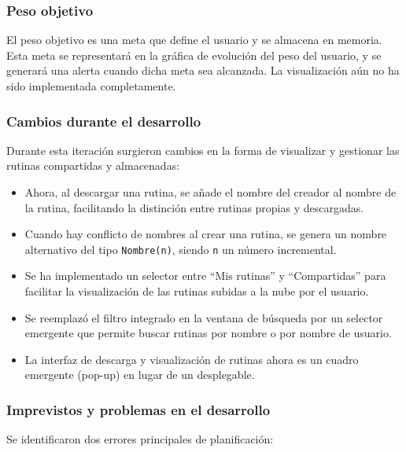 \subsubsection{Peso objetivo} %
El peso objetivo es una meta que define el usuario y se almacena en memoria. Esta meta se representar\'a en la gr\'afica de evoluci\'on del peso del usuario, y se generar\'a una alerta cuando dicha meta sea alcanzada. La visualizaci\'on a\'un no ha sido implementada completamente. %

\subsubsection{Cambios durante el desarrollo} 

Durante esta iteraci\'on surgieron cambios en la forma de visualizar y gestionar las rutinas compartidas y almacenadas:

\begin{itemize}
  \item Ahora, al descargar una rutina, se a\~nade el nombre del creador al nombre de la rutina, facilitando la distinci\'on entre rutinas propias y descargadas.
  \item Cuando hay conflicto de nombres al crear una rutina, se genera un nombre alternativo del tipo \texttt{Nombre(n)}, siendo \texttt{n} un n\'umero incremental.
  \item Se ha implementado un selector entre ``Mis rutinas'' y ``Compartidas'' para facilitar la visualizaci\'on de las rutinas subidas a la nube por el usuario.
  \item Se reemplaz\'o el filtro integrado en la ventana de b\'usqueda por un selector emergente que permite buscar rutinas por nombre o por nombre de usuario.
  \item La interfaz de descarga y visualizaci\'on de rutinas ahora es un cuadro emergente (pop-up) en lugar de un desplegable.
\end{itemize}

\subsubsection{Imprevistos y problemas en el desarrollo}
Se identificaron dos errores principales de planificaci\'on:

